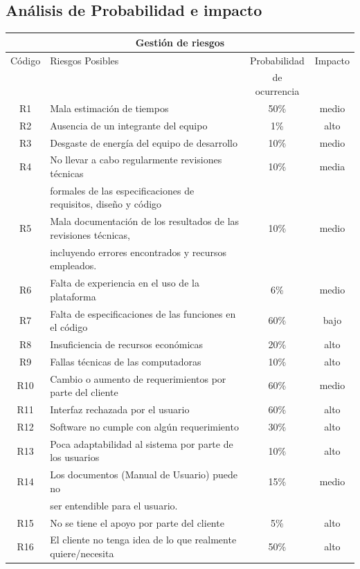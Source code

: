 \documentclass[11pt,letterpaper]{report}
\begin{document}
\subsection{Análisis de Probabilidad e impacto}
\begin{tabular}{|c|l|c|c|}
	\hline
	\multicolumn{4}{|c|}{Gestión de riesgos}\\ \hline
	Código & Riesgos Posibles & Probabilidad & Impacto \\ 
	& & de ocurrencia & \\ \hline
	R1 & Mala estimación de tiempos  & 50\% & medio \\ \hline
	R2 & Ausencia de un integrante del equipo & 1\% & alto \\ \hline
	R3 & Desgaste de energía del equipo de desarrollo & 10\% & medio  \\ \hline
	R4 & No llevar a cabo regularmente revisiones técnicas  & 10\% & media \\ 
	& formales de las especificaciones de requisitos, diseño y código & & \\ \hline
	R5 & Mala documentación de los resultados de las revisiones técnicas,  & 10\% & medio \\ 
	& incluyendo errores encontrados y recursos empleados. && \\ \hline
	R6 & Falta de experiencia en el uso de la plataforma & 6\% & medio \\ \hline
	R7 & Falta de especificaciones de las funciones en el código & 60\% & bajo \\ \hline
	R8 & Insuficiencia de recursos económicas & 20\% & alto \\ \hline
	R9 & Fallas técnicas de las computadoras & 10\% & alto \\ \hline
	R10 & Cambio o aumento de requerimientos por parte del cliente & 60\% & medio \\ \hline
	R11 & Interfaz rechazada por el usuario & 60\% & alto \\ \hline
	R12 & Software no cumple con algún requerimiento & 30\% & alto \\ \hline
	R13 & Poca adaptabilidad al sistema por parte de los usuarios & 10\% & alto  \\ \hline
	R14 & Los documentos (Manual de Usuario) puede no  & 15\% & medio \\ 
	& ser entendible para el usuario. && \\ \hline
	R15 & No se tiene el apoyo por parte del cliente & 5\% & alto \\ \hline
	R16 & El cliente no tenga idea de lo que realmente quiere/necesita & 50\% & alto \\ \hline

\end{tabular}
\end{document}
